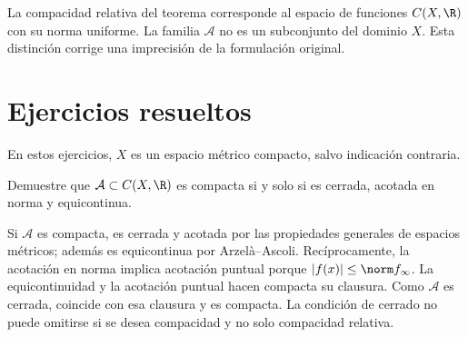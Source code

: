 \begin{observacion}
La compacidad relativa del teorema corresponde al espacio de funciones $C(X,\R)$ con su norma uniforme. La familia $\mathcal A$ no es un subconjunto del dominio $X$. Esta distinción corrige una imprecisión de la formulación original.
\end{observacion}

\section{Ejercicios resueltos}
En estos ejercicios, $X$ es un espacio métrico compacto, salvo indicación contraria.
\begin{ejercicio}
Demuestre que $\mathcal A\subset C(X,\R)$ es compacta si y solo si es cerrada, acotada en norma y equicontinua.
\end{ejercicio}
\begin{solucion}
Si $\mathcal A$ es compacta, es cerrada y acotada por las propiedades generales de espacios métricos; además es equicontinua por Arzelà--Ascoli. Recíprocamente, la acotación en norma implica acotación puntual porque $|f(x)|\le\norm f_\infty$. La equicontinuidad y la acotación puntual hacen compacta su clausura. Como $\mathcal A$ es cerrada, coincide con esa clausura y es compacta. La condición de cerrado no puede omitirse si se desea compacidad y no solo compacidad relativa.
\end{solucion}


